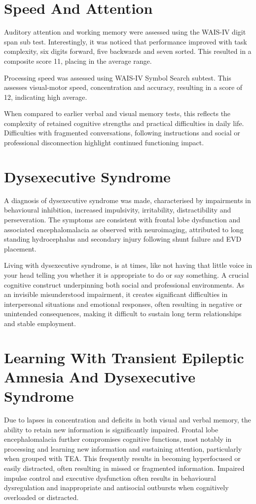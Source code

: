 \documentclass{article}
\begin{document}
\section*{Speed And Attention}
Auditory attention and working memory were assessed using the WAIS-IV digit span sub test. Interestingly, it was noticed that performance improved with task complexity, six digits forward, five backwards and seven sorted. This resulted in a composite score 11, placing in the average range.

Processing speed was assessed using WAIS-IV Symbol Search subtest. This assesses visual-motor speed, concentration and accuracy, resulting in a score of 12, indicating high average.

When compared to earlier verbal and visual memory tests, this reflects the complexity of retained cognitive strengths and practical difficulties in daily life. Difficulties with fragmented conversations, following instructions and social or professional disconnection highlight continued functioning impact.

\section*{Dysexecutive Syndrome}
A diagnosis of dysexecutive syndrome was made, characterised by impairments in behavioural inhibition, increased impulsivity, irritability, distractibility and perseveration. The symptoms are consistent with frontal lobe dysfunction and associated encephalomalacia as observed with neuroimaging, attributed to long standing hydrocephalus and secondary injury following shunt failure and EVD placement.

Living with dysexecutive syndrome, is at times, like not having that little voice in your head telling you whether it is appropriate to do or say something. A crucial cognitive construct underpinning both social and professional environments. As an invisible misunderstood impairment, it creates significant difficulties in interpersonal situations and emotional responses, often resulting in negative or unintended consequences, making it difficult to sustain long term relationships and stable employment.

\section*{Learning With Transient Epileptic Amnesia And Dysexecutive Syndrome}
Due to lapses in concentration and deficits in both visual and verbal memory, the ability to retain new information is significantly impaired. Frontal lobe encephalomalacia further compromises cognitive functions, most notably in processing and learning new information and sustaining attention, particularly when grouped with TEA. This frequently results in becoming hyperfocused or easily distracted, often resulting in missed or fragmented information. Impaired impulse control and executive dysfunction often results in behavioural dysregulation and inappropriate and antisocial outbursts when cognitively overloaded or distracted.
\end{document}
